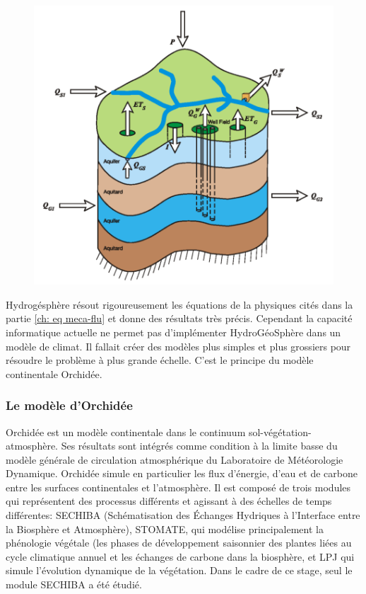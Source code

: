 \documentclass[a4paper,11pt]{article}
\numberwithin{equation}{section}
\begin{document}
\begin{figure}[h]
	\begin{center}
		\includegraphics[scale=0.35]{HGS_modele.png}
	\end{center}
	\label{fig:HGS_water_balance}
\end{figure}

Hydrogésphère résout rigoureusement les équations de la physiques cités dans la partie \ref{ch: eq meca-flu} et donne des résultats très précis. Cependant la capacité informatique actuelle ne permet pas d'implémenter HydroGéoSphère dans un modèle de climat. Il fallait créer des modèles plus simples et plus grossiers pour résoudre le problème à plus grande échelle. C'est le principe du modèle continentale Orchidée. 

\subsubsection{Le modèle d'Orchidée}

Orchidée est un modèle continentale dans le continuum sol-végétation-atmosphère. Ses résultats sont intégrés comme condition à la limite basse du modèle générale de circulation atmosphérique du Laboratoire de Météorologie Dynamique. Orchidée simule en particulier les flux d’énergie, d’eau et de carbone entre les surfaces continentales et l’atmosphère. Il est composé de trois modules qui représentent des processus différents et agissant à des échelles de temps différentes: SECHIBA (Schématisation des Échanges Hydriques à l’Interface entre la Biosphère et Atmosphère), STOMATE, qui modélise principalement la phénologie végétale (les phases de développement saisonnier des plantes liées au cycle climatique annuel et les échanges de carbone dans la biosphère, et LPJ qui simule l’évolution dynamique de la végétation. Dans le cadre de ce stage, seul le module SECHIBA a été étudié.
\end{document}
